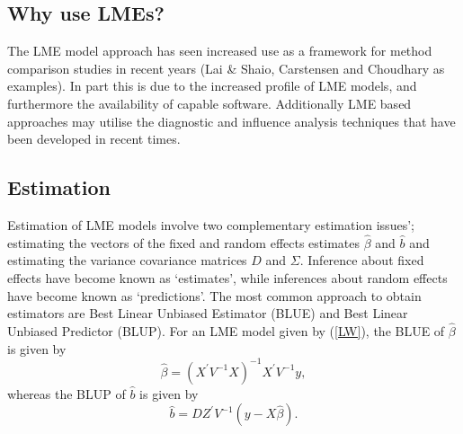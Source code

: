 \documentclass[12pt, a4paper]{article}
\theoremstyle{plain}
\theoremstyle{definition}
\theoremstyle{remark}
\begin{document}
\subsection{Why use LMEs?}
The LME model  approach has seen increased use as a framework for method comparison studies in recent years (Lai & Shaio, Carstensen and Choudhary as examples). In part this is due to the increased profile of LME models, and furthermore the availability of capable software. Additionally LME based approaches may utilise the diagnostic and influence analysis techniques that have been developed in recent times.


\subsection{Estimation}
Estimation of LME models involve two complementary estimation issues'; estimating the vectors of the fixed and random effects estimates $\hat{\beta}$ and $\hat{b}$ and estimating the variance covariance matrices $D$ and $\Sigma$.
Inference about fixed effects have become known as `estimates', while inferences about random effects have become known as `predictions'. The most common approach to obtain estimators are Best Linear Unbiased Estimator (BLUE) and Best Linear Unbiased Predictor (BLUP). For an LME model given by (\ref{LW}), the BLUE of $\hat{\beta}$ is given by
\[\hat{\beta} = (X^\prime V^{-1}X)^{-1}X^\prime V^{-1}y,\]whereas the BLUP of $\hat{b}$ is given by
\[\hat{b} = DZ^{\prime} V^{-1} (y-X\hat{\beta}).\]
\end{document}
